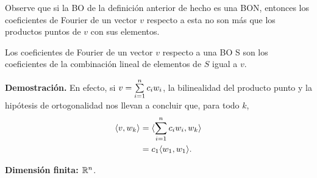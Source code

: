 Observe que si la BO de la definición anterior de hecho
es una BON, entonces los coeficientes de Fourier de un 
vector $v$ respecto a esta no son más que los productos
puntos de $v$ con sus elementos.

\begin{prop}
Los coeficientes de Fourier de un vector $v$
respecto a una BO S son los coeficientes
de la combinación lineal de elementos de $S$ igual a $v$.
\end{prop}
\noindent
\textbf{Demostración.}
En efecto, si $v=\sum\limits_{i=1}^{n}c_{i}w_{i}$,
la bilinealidad del producto punto y la hipótesis 
de ortogonalidad nos llevan a concluir que, 
para todo $k$,
\begin{align*}
\langle  v , w_{k} \rangle &= \langle \sum\limits_{i=1}^{n}c_{i}w_{i}  , w_{k} \rangle \\
& = c_{1} \langle w_{1}  , w_{1} \rangle.
\end{align*}
\QEDB
\vspace{0.2cm}





\textbf{Dimensión finita: $\mathbb{R}^{n}$}. 

